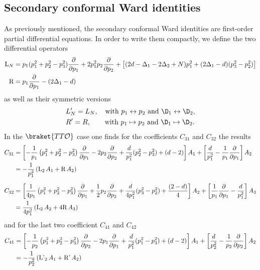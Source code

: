 \documentclass[a4paper,11pt,openright,twoside]{book}
\newcommand{\mO}{\mathcal{O}}
\numberwithin{equation}{section}
\begin{document}
{{{	
	\subsection{Secondary conformal Ward identities}\label{secondary2}
	As previously mentioned, the secondary conformal Ward identities are first-order partial differential equations. In order to write them compactly, we define the two differential operators
	\begin{align}
		\textup{L}_N&= p_1(p_1^2 + p_2^2 - p_3^2) \frac{\partial}{\partial p_1} + 2 p_1^2 p_2 \frac{\partial}{\partial p_2} + \left[ (2d - \Delta_1 - 2\Delta_2 +N)p_1^2 + (2\Delta_1-d)(p_3^2-p_2^2)  \right]\label{Ldef} \\
		\textup{R} &= p_1 \frac{\partial}{\partial p_1} - (2\Delta_1-d) \label{Rdef}\, 
	\end{align}
	as well as their symmetric versions
	\begin{align}
		&L'_N=L_N,\quad\text{with}\ p_1\leftrightarrow p_2\ \text{and}\ \D_1\leftrightarrow\D_2,\\
		&R'=R,\qquad\text{with}\ p_1\mapsto p_2\ \text{and}\ \D_1\mapsto\D_2.
	\end{align}
	In the $\braket{TT\mO}$ case one finds for the coefficients $C_{31}$ and $C_{32}$ the results
	\begin{align}
		C_{31}&= \left[ - \frac{1}{p_1} \left( p_1^2 + p_2^2 - p_3^2 \right) \frac{\partial}{\partial p_1} - 2 p_2 \frac{\partial}{\partial p_2}  + \frac{d}{p_1^2} (p_2^2-p_3^2) + (d-2)  \right]A_1 + \left[ \frac{d}{p_1^2} - \frac{1}{p_1} \frac{\partial}{\partial p_1}   \right] A_2   \nonumber \\&= -\frac{1}{p_1^2}\left( \textup{L}_2\, A_1 + \textup{R}\, A_2 \right) \\[1.5ex] 
		C_{32}&= \left[  \frac{1}{4 p_1} \left( p_1^2 + p_2^2 - p_3^2 \right) \frac{\partial}{\partial p_1} + \frac{1}{2} p_2 \frac{\partial}{\partial p_2}  + \frac{d}{4 p_1^2} (p_3^2-p_2^2) + \frac{(2-d)}{4}  \right]A_2 + \left[\frac{1}{p_1} \frac{\partial}{\partial p_1}   - \frac{d}{p_1^2}  \right] A_3   \nonumber \\&= \frac{1}{4 p_1^2}\left( \textup{L}_2\, A_2 + 4 \textup{R}\, A_3 \right)    
	\end{align}
	and for the last two coefficient $C_{41}$ and $C_{42}$
	\begin{align}
		C_{41}&= \left[ - \frac{1}{p_2} \left( p_1^2 + p_2^2 - p_3^2 \right) \frac{\partial}{\partial p_2} - 2 p_1 \frac{\partial}{\partial p_1}  + \frac{d}{p_1^2} (p_1^2-p_3^2) + (d-2)  \right]A_1 + \left[ \frac{d}{p_2^2} - \frac{1}{p_2} \frac{\partial}{\partial p_2}   \right] A_2   \nonumber \\&= -\frac{1}{p_2^2}\left( \textup{L'}_2\, A_1 + \textup{R'}\, A_2 \right) \\[1.5ex] 

\end{align}}}}
\end{document}
